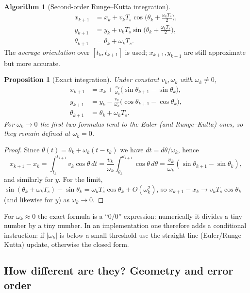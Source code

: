 \documentclass[11pt,a4paper]{article}
\newcommand{\Ts}{T_s}
\theoremstyle{plain}
\newtheorem{proposition}[theorem]{Proposition}
\theoremstyle{definition}
\newtheorem{algorithm}[theorem]{Algorithm}
\theoremstyle{remark}
\begin{document}
\begin{algorithm}[Second-order Runge--Kutta integration]\label{alg:rk}
\begin{align}
x_{k+1}&=x_k+v_k\Ts\cos\!\Big(\theta_k+\frac{\omega_k\Ts}{2}\Big),\nonumber\\
y_{k+1}&=y_k+v_k\Ts\sin\!\Big(\theta_k+\frac{\omega_k\Ts}{2}\Big),\label{eq:rk}\\
\theta_{k+1}&=\theta_k+\omega_k\Ts .\nonumber
\end{align}
The \emph{average orientation} over $[t_k,t_{k+1}]$ is used; $x_{k+1},y_{k+1}$ are still
approximate but more accurate.
\end{algorithm}

\begin{proposition}[Exact integration]\label{prop:exact}
Under constant $v_k,\omega_k$ with $\omega_k\neq 0$,
\begin{align}
x_{k+1}&=x_k+\frac{v_k}{\omega_k}\big(\sin\theta_{k+1}-\sin\theta_k\big),\nonumber\\
y_{k+1}&=y_k-\frac{v_k}{\omega_k}\big(\cos\theta_{k+1}-\cos\theta_k\big),\label{eq:exact}\\
\theta_{k+1}&=\theta_k+\omega_k\Ts .\nonumber
\end{align}
For $\omega_k\to0$ the first two formulas tend to the Euler (and Runge--Kutta) ones, so they remain
defined at $\omega_k=0$.
\end{proposition}
\begin{proof}
Since $\theta(t)=\theta_k+\omega_k(t-t_k)$ we have $dt=d\theta/\omega_k$, hence
\[
x_{k+1}-x_k=\int_{t_k}^{t_{k+1}}v_k\cos\theta\,dt=\frac{v_k}{\omega_k}\int_{\theta_k}^{\theta_{k+1}}\cos\theta\,d\theta
=\frac{v_k}{\omega_k}(\sin\theta_{k+1}-\sin\theta_k),
\]
and similarly for $y$. For the limit, $\sin(\theta_k+\omega_k\Ts)-\sin\theta_k=\omega_k\Ts\cos\theta_k+O(\omega_k^2)$,
so $x_{k+1}-x_k\to v_k\Ts\cos\theta_k$ (and likewise for $y$) as $\omega_k\to0$.
\end{proof}

\begin{intuition}
For $\omega_k\approx0$ the exact formula is a ``$0/0$'' expression: numerically it divides a tiny
number by a tiny number. In an implementation one therefore adds a conditional instruction: if
$|\omega_k|$ is below a small threshold use the straight-line (Euler/Runge--Kutta) update, otherwise
the closed form.
\end{intuition}

\subsection{How different are they? Geometry and error order}
\end{document}

